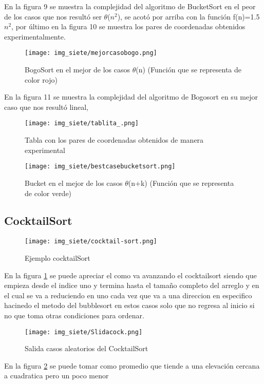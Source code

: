 \documentclass[12pt,twoside]{article}
\begin{document}
En la figura 9 se muestra la complejidad del algoritmo de BucketSort en el peor de los casos que nos resultó ser $\theta$($n^2$), se acotó por arriba con la función f(n)=1.5$n^2$, por último en la figura 10 se muestra los pares de coordenadas obtenidos experimentalmente.
\begin{figure}[H]
\centering
\texttt{[image: img\_siete/mejorcasobogo.png]}
\caption{BogoSort en el mejor de los casos $\theta$(n) (Función que se representa de color rojo)}
\end{figure}
En la figura 11 se muestra la complejidad del algoritmo de Bogosort en su mejor caso que nos resultó lineal,
\begin{figure}[H]
\centering
\texttt{[image: img\_siete/tablita\_.png]}
\caption{Tabla con los pares de coordenadas obtenidos de manera experimental}
\end{figure}
\vspace{10 mm}
\begin{figure}[H]
\centering
\texttt{[image: img\_siete/bestcasebucketsort.png]}
\caption{Bucket en el mejor de los casos $\theta$(n+k) (Función que se representa de color verde)}
\end{figure}

\subsection{CocktailSort}

\begin{figure}[H]
\centering
\texttt{[image: img\_siete/cocktail-sort.png]}
\caption{Ejemplo cocktailSort}
\label{CocktailSortexample}
\end{figure}

En la figura \ref{CocktailSortexample} se puede apreciar el como va avanzando el cocktailsort siendo que empieza desde el indice uno y termina hasta el tamaño completo del arreglo y en el cual se va a reduciendo en uno cada vez que va a una direccion en especifico hacinedo el metodo del bubblesort en estos casos solo que no regresa al inicio si no que toma otras condiciones para ordenar.

\begin{figure}[H]
\centering
\texttt{[image: img\_siete/Slidacock.png]}
\caption{Salida casos aleatorios del CocktailSort}
\label{Salidacockrandom}
\end{figure}

En la figura \ref{Salidacockrandom} se puede tomar como promedio que tiende a una elevación cercana a cuadratica pero un poco menor
\end{document}
